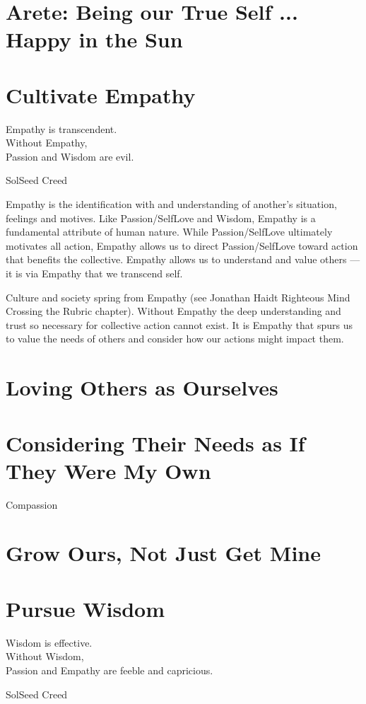 \documentclass[ebook,12pt,openany,twoside]{memoir}
\newcommand{\tab}{\hspace*{2em}}
\begin{document}
\chapter{Arete: Being our True Self ... Happy in the Sun}


\chapter{Cultivate Empathy}

\setlength\epigraphwidth{2.8in}
\epigraph{
  Empathy is transcendent.\\
  Without Empathy,\\
  \tab Passion and Wisdom are evil.
}{SolSeed Creed}

Empathy is the identification with and understanding of another's situation,
feelings and motives. Like Passion/SelfLove and Wisdom, Empathy is a
fundamental attribute of human nature. While Passion/SelfLove ultimately
motivates all action, Empathy allows us to direct Passion/SelfLove toward
action that benefits the collective. Empathy allows us to understand and
value others --- it is via Empathy that we transcend self.

Culture and society spring from Empathy (see Jonathan Haidt Righteous Mind
Crossing the Rubric chapter). Without Empathy the deep understanding and trust
so necessary for collective action cannot exist. It is Empathy that spurs us to
value the needs of others and consider how our actions might impact them.

\chapter{Loving Others as Ourselves}

\chapter{Considering Their Needs as If They Were My Own}

Compassion

\chapter{Grow Ours, Not Just Get Mine}

\chapter{Pursue Wisdom}

\setlength\epigraphwidth{3.8in}
\epigraph{
  Wisdom is effective.\\
  Without Wisdom,\\
  \tab Passion and Empathy are feeble and capricious.
}{SolSeed Creed}
\end{document}
